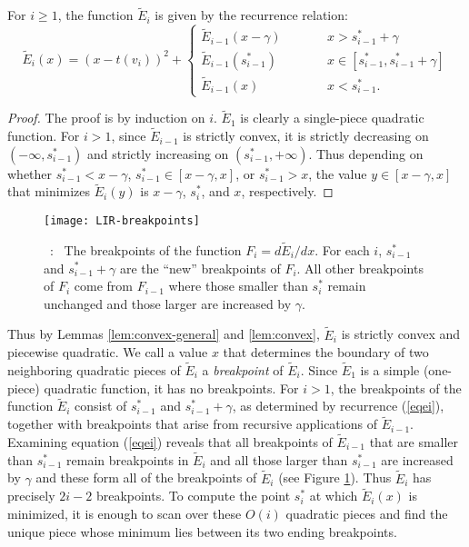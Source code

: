 \documentclass[11pt]{article}
\newcommand\myCaption[1]{\small\refstepcounter{figure}\figurename\ \thefigure :\ #1}
\begin{document}
\begin{lemma}\label{lem:convex}
For $i \geq 1$, the function $\tilde E_i$ is given by the recurrence relation:
\begin{equation}\label{eqei}
\tilde E_{i}(x) = (x - t(v_i))^2 + \left\{\begin{array}{lll} \tilde E_{i-1}(x - \gamma) & \qquad & x > s^*_{i-1} + \gamma \\
\tilde E_{i-1}(s^*_{i-1}) & & x \in [s^*_{i-1}, s^*_{i-1}+\gamma] \\
\tilde E_{i-1}(x)&& x < s^*_{i-1}. \end{array}\right.
\end{equation}
\end{lemma}
\begin{proof}
The proof is by induction on $i$. $\tilde E_1$ is clearly a single-piece quadratic function. For $i > 1$, since $\tilde E_{i-1}$ is strictly convex, it is strictly decreasing on $(-\infty, s^*_{i-1})$ and strictly increasing on $(s^*_{i-1}, +\infty)$. Thus depending on whether $s^*_{i-1} < x - \gamma$, $s^*_{i-1} \in [x - \gamma, x]$, or $s^*_{i-1} > x$, the value $y \in [x - \gamma, x]$ that minimizes $\tilde E_i(y)$ is $x-\gamma$, $s^*_i$, and $x$, respectively. 
\end{proof}


\begin{figure}
\begin{center}
\texttt{[image: LIR-breakpoints]}
\end{center}
\myCaption{\label{fig:LIR-breakpoints} The breakpoints of the function $F_i = d \tilde{E}_i / dx$. For each $i$, $s^*_{i-1}$ and $s^*_{i-1}+\gamma$ are the ``new'' breakpoints of $F_i$. All other breakpoints of $F_i$ come from $F_{i-1}$ where those smaller than $s^*_i$ remain unchanged and those larger are increased by $\gamma$.}
\end{figure}

Thus by Lemmas \ref{lem:convex-general} and \ref{lem:convex}, $\tilde E_i$ is strictly convex and piecewise quadratic. 
We call a value $x$ that determines the boundary of two neighboring quadratic pieces of $\tilde E_i$ a {\em breakpoint} of $\tilde E_i$. Since $\tilde E_1$ is a simple (one-piece) quadratic function, it has no breakpoints. For $i > 1$, the  breakpoints of the function $\tilde E_i$ consist of $s^*_{i-1}$ and $s^*_{i-1} + \gamma$, as determined by recurrence (\ref{eqei}), together with breakpoints that arise from recursive applications of $\tilde E_{i-1}$. 
Examining equation (\ref{eqei}) reveals that all breakpoints of $\tilde E_{i-1}$ that are smaller than $s^*_{i-1}$ remain breakpoints in $\tilde E_i$ and all those larger than $s^*_{i-1}$ are increased by $\gamma$ and these form all of the breakpoints of $\tilde E_i$ (see Figure \ref{fig:LIR-breakpoints}).  Thus $\tilde E_i$ has precisely $2i - 2$ breakpoints. 
To compute the point $s^*_i$ at which $\tilde E_i(x)$ is minimized, it is enough to scan over these $O(i)$ quadratic pieces and find the unique piece whose minimum lies between its two ending breakpoints. 
\end{document}
